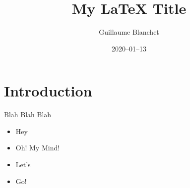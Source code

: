 \documentclass[12pt]{article}
\title{My LaTeX Title}
\author{Guillaume Blanchet}
\date{2020–01–13}
\begin{document}
\maketitle

\section{Introduction}

Blah Blah Blah

\begin{itemize}

\item Hey

\item Oh! My Mind!

\item Let’s

\item Go!

\end{itemize}
\end{document}
